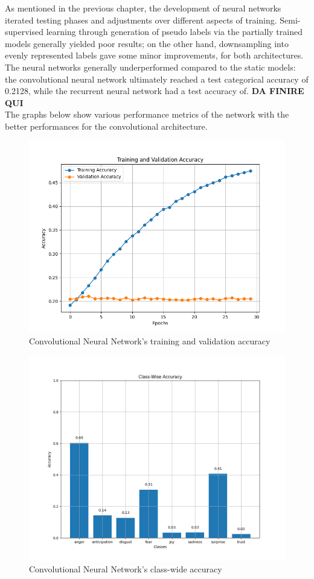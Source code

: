 As mentioned in the previous chapter, the development of neural networks
iterated testing phases and adjustments over different aspects of training.
Semi-supervised learning through generation of pseudo labels via the partially
trained models generally yielded poor results; on the other hand, downsampling
into evenly represented labels gave some minor improvements, for both architectures.
The neural networks generally underperformed compared to the static models:
the convolutional neural network ultimately reached a test categorical accuracy
of 0.2128, while the recurrent neural network had a test accuracy of. \textbf{DA FINIRE QUI}\\

The graphs below show various performance metrics of the network with the better
performances for the convolutional architecture.
\begin{figure}[H]
    \centering
    \includegraphics[width=0.7\linewidth]{pictures/cnn_accuracy.png}
    \caption{Convolutional Neural Network's training and validation accuracy}
    \label{fig:cnn_train_val_acc}
\end{figure}

\begin{figure}[H]
    \centering
    \includegraphics[width=0.8\linewidth]{pictures/cnn_class_accuracy.png}
    \caption{Convolutional Neural Network's class-wide accuracy}
    \label{fig:cnn_classacc}
\end{figure}

